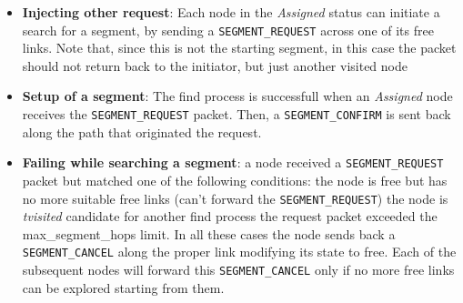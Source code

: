 \begin{itemize}

\item{\textbf{Injecting other request}}: Each node in the \emph{Assigned} status can initiate a search for a
segment, by sending a \texttt{SEGMENT\_REQUEST} across one of its free
links. Note that, since this is not the starting segment, in this case
the packet should not return back to the initiator, but just another visited
node
\item{\textbf{Setup of a segment}}: The find process is successfull
when an \emph{Assigned} node receives the \texttt{SEGMENT\_REQUEST} packet. Then, a \texttt{SEGMENT\_CONFIRM} is
sent back along the path that originated the request.  
\item{\textbf{Failing while searching a segment}}: a node received a \texttt{SEGMENT\_REQUEST} packet but
matched one of the following conditions: the node is free but has no
more suitable free links (can’t forward the \texttt{SEGMENT\_REQUEST}) the node
is \emph{tvisited} candidate for another find process the request packet
exceeded the max\_segment\_hops limit.  In all these cases the node
sends back a \texttt{SEGMENT\_CANCEL} along the proper link modifying its state
to free. Each of the subsequent nodes will forward this \texttt{SEGMENT\_CANCEL}
only if no more free links can be explored starting from them.
\end{itemize}




